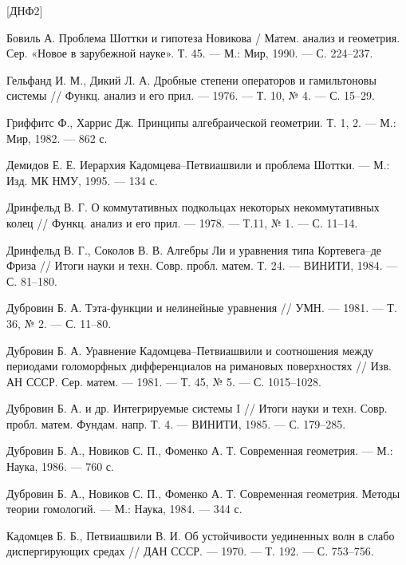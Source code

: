 \documentclass{article}
\theoremstyle{definition}
\theoremstyle{definition} %
\theoremstyle{remark}     %
\theoremstyle{definition}
\theoremstyle{definition}
\theoremstyle{definition}
\theoremstyle{definition}
\theoremstyle{definition}
\theoremstyle{definition}
\theoremstyle{definition}
\theoremstyle{definition}
\begin{document}
\newpage


\begin{thebibliography}{[ДНФ2]}

 Бовиль А. Проблема Шоттки и гипотеза Новикова / Матем. анализ и геометрия. Сер. «Новое в зарубежной науке». Т. 45. --- М.: Мир, 1990. --- С. 224--237.

 Гельфанд И. М., Дикий Л. А. Дробные степени операторов и гамильтоновы системы // Функц. анализ и его прил. --- 1976. --- Т. 10, № 4. --- С. 15--29.

 Гриффитс Ф., Харрис Дж. Принципы алгебраической геометрии. Т. 1, 2. --- М.: Мир, 1982. --- 862 с.

 Демидов Е. Е. Иерархия Кадомцева--Петвиашвили и проблема Шоттки. --- М.: Изд. МК НМУ, 1995. --- 134 с.

 Дринфельд В. Г. О коммутативных подкольцах некоторых некоммутативных колец // Функц. анализ и его прил. --- 1978. --- Т.11, № 1. --- С. 11--14.

 Дринфельд В. Г., Соколов В. В. Алгебры Ли и уравнения типа Кортевега--де Фриза // Итоги науки и техн. Совр. пробл. матем. Т. 24. --- ВИНИТИ, 1984. --- С. 81--180.

 Дубровин Б. А. Тэта-функции и нелинейные уравнения // УМН. --- 1981. --- Т. 36, № 2. --- С. 11--80.

 Дубровин Б. А. Уравнение Кадомцева--Петвиашвили и соотношения между периодами голоморфных дифференциалов на римановых поверхностях // Изв. АН СССР. Сер. матем. --- 1981. --- Т. 45, № 5. --- С. 1015--1028.

 Дубровин Б. А. и др. Интегрируемые системы I // Итоги науки и техн. Совр. пробл. матем. Фундам. напр. Т. 4. --- ВИНИТИ, 1985. --- С. 179--285.

 Дубровин Б. А., Новиков С. П., Фоменко А. Т. Современная геометрия. --- М.: Наука, 1986. --- 760 с.

 Дубровин Б. А., Новиков С. П., Фоменко А. Т. Современная геометрия. Методы теории гомологий. --- М.: Наука, 1984. --- 344 с.

 Кадомцев Б. Б., Петвиашвили В. И. Об устойчивости уединенных волн в слабо диспергирующих средах // ДАН СССР. --- 1970. --- Т. 192. --- С. 753--756.


\end{thebibliography}
\end{document}
